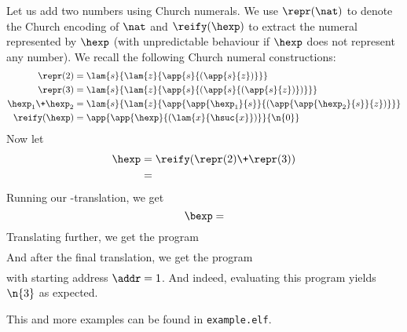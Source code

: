 Let us add two numbers using Church numerals.
We use $\repr(\nat)$ to denote the Church encoding of $\nat$ and $\reify(\hexp)$ to extract the numeral represented by $\hexp$ (with unpredictable behaviour if $\hexp$ does not represent any number).
We recall the following Church numeral constructions:
\begin{align*}
  \repr(2) &= \lam{s}{\lam{z}{\app{s}{(\app{s}{z})}}} \\
  \repr(3) &= \lam{s}{\lam{z}{\app{s}{(\app{s}{(\app{s}{z})})}}} \\
  \hexp_1 \+ \hexp_2 &= \lam{s}{\lam{z}{\app{\app{\hexp_1}{s}}{(\app{\app{\hexp_2}{s}}{z})}}} \\
  \reify(\hexp) &= \app{\app{\hexp}{(\lam{x}{\hsuc{x}})}}{\n{0}}
\end{align*}
Now let
\begin{align*}
  \hexp &= \reify(\repr(2) \+ \repr(3)) \\
  &= 
\end{align*}
Running our \hlang-\blang translation, we get
\[
\bexp = 
\]
Translating further, we get the \slang program
{\footnotesize
\begin{align*}
\quad 
\end{align*}
}
And after the final translation, we get the \mlang program
{\footnotesize
\begin{align*}

\end{align*}
}
with starting address $\addr = 1$.
And indeed, evaluating this program yields $\n{3}$ as expected.

\Twelf
This and more examples can be found in \texttt{example.elf}.
